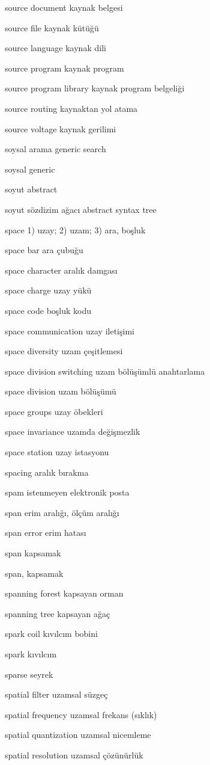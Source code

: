 \documentclass[12pt,fleqn]{article}\usepackage{../../common}
\begin{document}
source document kaynak belgesi

source file kaynak kütüğü

source language kaynak dili

source program kaynak program

source program library kaynak program belgeliği

source routing kaynaktan yol atama

source voltage kaynak gerilimi

soysal arama generic search

soysal generic

soyut abstract

soyut sözdizim ağacı abstract syntax tree

space 1) uzay; 2) uzam; 3) ara, boşluk

space bar ara çubuğu

space character aralık damgası

space charge uzay yükü

space code boşluk kodu

space communication uzay iletişimi

space diversity uzam çeşitlemesi

space division switching uzam bölüşümlü anahtarlama

space division uzam bölüşümü

space groups uzay öbekleri

space invariance uzamda değişmezlik

space station uzay istasyonu

spacing aralık bırakma

spam istenmeyen elektronik posta

span erim aralığı, ölçüm aralığı

span error erim hatası

span kapsamak

span, kapsamak

spanning forest kapsayan orman

spanning tree kapsayan ağaç

spark coil kıvılcım bobini

spark kıvılcım

sparse seyrek

spatial filter uzamsal süzgeç

spatial frequency uzamsal frekans (sıklık)

spatial quantization uzamsal nicemleme

spatial resolution uzamsal çözünürlük
\end{document}
